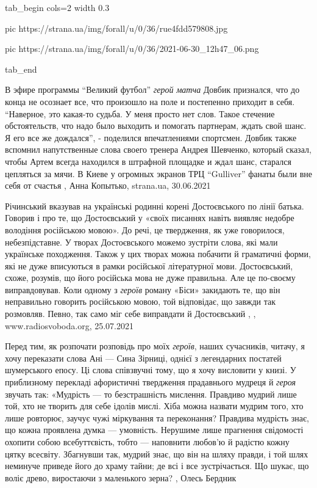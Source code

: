 
\ifcmt
  tab_begin cols=2
	width 0.3

     pic https://strana.ua/img/forall/u/0/36/rue4fdd579808.jpg

     pic https://strana.ua/img/forall/u/0/36/2021-06-30_12h47_06.png

  tab_end
\fi

В эфире программы \enquote{Великий футбол} \emph{герой матча} Довбик признался, что до
конца не осознает все, что произошло на поле и постепенно приходит в себя. 
\enquote{Наверное, это какая-то судьба. У меня просто нет слов. Такое стечение
обстоятельств, что надо было выходить и помогать партнерам, ждать свой шанс. Я
его все же дождался}, - поделился впечатлениями спортсмен.  Довбик также
вспомнил напутственные слова своего тренера Андрея Шевченко, который сказал,
чтобы Артем всегда находился в штрафной площадке и ждал шанс, старался
цепляться за мячи.  В Киеве у огромных экранов ТРЦ \enquote{Gulliver} фанаты были вне
себя от счастья
, 
Анна Копытько, strana.ua, 30.06.2021

Річинський вказував на українські родинні корені Достоєвського по лінії батька.
Говорив і про те, що Достоєвський у «своїх писаннях навіть виявляє недобре
володіння російською мовою». До речі, це твердження, як уже говорилося,
небезпідставне. У творах Достоєвського можемо зустріти слова, які мали
українське походження. Також у цих творах можна побачити й граматичні форми,
які не дуже вписуються в рамки російської літературної мови. Достоєвський,
схоже, розумів, що його російська мова не дуже правильна. Але це по-своєму
виправдовував. Коли одному з \emph{героїв} роману «Біси» закидають те, що він
неправильно говорить російською мовою, той відповідає, що завжди так розмовляв.
Певно, так само міг себе виправдати й Достоєвський
, 
, www.radiosvoboda.org, 25.07.2021

Перед тим, як розпочати розповідь про моїх \emph{героїв}, наших сучасників, читачу, я
хочу переказати слова Ані — Сина Зірниці, однієї з легендарних постатей
шумерського епосу. Ці слова співзвучні тому, що я хочу висловити у книзі. У
приблизному перекладі афористичні твердження прадавнього мудреця й \emph{героя}
звучать так: «Мудрість — то безстрашність мислення. Правдиво мудрий лише той,
хто не творить для себе ідолів мислі. Хіба можна назвати мудрим того, хто лише
ровторює, заучує чужі міркування та переконання? Правдива мудрість знає, що
кожна проявлена думка — умовність. Нерушиме лише прагнення свідомості охопити
собою всебуттєвість, тобто — наповнити любов’ю й радістю кожну цятку всесвіту.
Збагнувши так, мудрий знає, що він на шляху правди, і той шлях неминуче приведе
його до храму тайни; де всі і все зустрічається.  Що шукає, що воліє древо,
виростаючи з маленького зерна?
, Олесь Бердник

